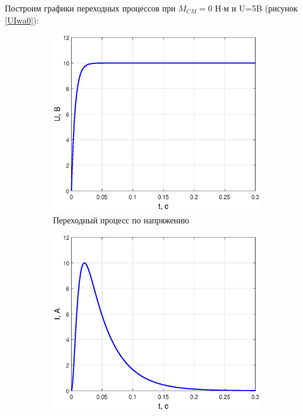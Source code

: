\documentclass[12pt,a4paper]{article}
\begin{document}
Построим графики переходных процессов при $M_{CM}=0$ Н$\cdot$м и U=5B (рисунок \ref{UIwa0}):
\begin{figure}[H]
	\centering
	\begin{subfigure}[b]{0.48\textwidth}
	    \includegraphics[width = \textwidth]{U0}
		\caption{Переходный процесс по напряжению}
	\end{subfigure}
	\hfill
	\begin{subfigure}[b]{0.48\textwidth}
		\includegraphics[width = \textwidth]{I0}

\end{subfigure}
\end{figure}
\end{document}
